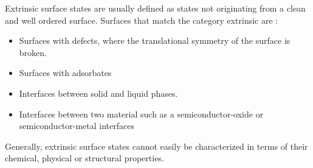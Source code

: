 Extrinsic surface states are usually defined as states not originating from a clean and well ordered surface. Surfaces that match the category extrinsic are :
\begin{itemize}
 \item Surfaces with defects, where the translational symmetry of the surface is broken.
 \item Surfaces with adsorbates
 \item Interfaces between solid and liquid phases.
 \item Interfaces between two material such as a semiconductor-oxide or semiconductor-metal interfaces
\end{itemize}
Generally, extrinsic surface states cannot easily be characterized in terms of their chemical, physical or structural properties.

